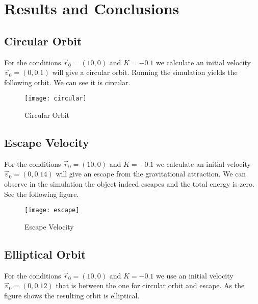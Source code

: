 \documentclass{article}
\begin{document}
\newpage 

\section{Results and Conclusions}

\subsection{Circular Orbit}
For the conditions $\overrightarrow{r}_0=(10,0)$ and $K=-0.1$ we calculate an initial velocity $\overrightarrow{v}_0=(0,0.1)$ will give a circular orbit.  Running the simulation yields the following orbit.  We can see it is circular.

\begin{figure}[h]
\begin{center}
\texttt{[image: circular]} %
\caption{Circular Orbit}
\end{center}
\end{figure}

\subsection{Escape Velocity}
For the conditions $\overrightarrow{r}_0=(10,0)$ and $K=-0.1$ we calculate an initial velocity $\overrightarrow{v}_0=(0,0.14)$ will give an escape from the gravitational attraction.  We can observe in the simulation the object indeed escapes and the total energy is zero.  See the following figure.

\begin{figure}[h]
\begin{center}
\texttt{[image: escape]} %
\caption{Escape Velocity}
\end{center}
\end{figure}

\newpage

\subsection{Elliptical Orbit}
For the conditions $\overrightarrow{r}_0=(10,0)$ and $K=-0.1$ we use an initial velocity $\overrightarrow{v}_0=(0,0.12)$ that is between the one for circular orbit and escape.  As the figure shows the resulting orbit is elliptical.
\end{document}

